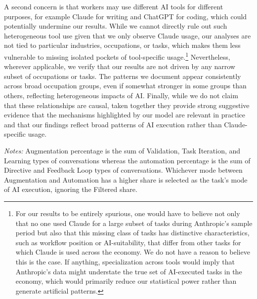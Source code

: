 A second concern is that workers may use different AI tools for different purposes, for example Claude for writing and ChatGPT for coding, which could potentially undermine our results.
While we cannot directly rule out such heterogeneous tool use given that we only observe Claude usage, our analyses are not tied to particular industries, occupations, or tasks, which makes them less vulnerable to missing isolated pockets of tool-specific usage.\footnote{
For our results to be entirely spurious, one would have to believe not only that no one used Claude for a large subset of tasks during Anthropic's sample period but also that this missing class of tasks has distinctive characteristics, such as workflow position or AI-suitability, that differ from other tasks for which Claude is used across the economy.
We do not have a reason to believe this is the case.
If anything, specialization across tools would imply that Anthropic's data might understate the true set of AI-executed tasks in the economy, which would primarily reduce our statistical power rather than generate artificial patterns.
}
Nevertheless, wherever applicable, we verify that our results are not driven by any narrow subset of occupations or tasks.
The patterns we document appear consistently across broad occupation groups, even if somewhat stronger in some groups than others, reflecting heterogeneous impacts of AI.
Finally, while we do not claim that these relationships are causal, taken together they provide strong suggestive evidence that the mechanisms highlighted by our model are relevant in practice and that our findings reflect broad patterns of AI execution rather than Claude-specific usage.


\begin{landscape}
\begin{table}[htbp]
    \caption{Example O*NET Tasks Associated with Claude Conversations, and Calculated Augmentation vs.\ Automation Outcomes}
    \label{tab:example_anthropic_AI_tasks}
    \begin{center}
    
    \end{center}
    \footnotesize{\emph{Notes:} Augmentation percentage is the sum of Validation, Task Iteration, and Learning types of conversations whereas the automation percentage is the sum of Directive and Feedback Loop types of conversations. 
    Whichever mode between Augmentation and Automation has a higher share is selected as the task's mode of AI execution, ignoring the Filtered share.}
\end{table}
\end{landscape}
